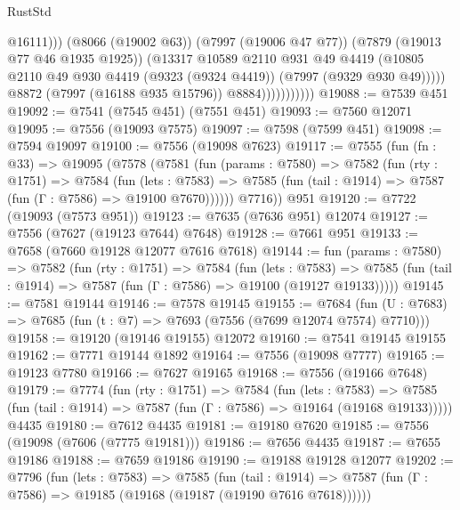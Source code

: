 \begin{lexlean}{RustStd}
\begin{coremodule}
                                  @16111)))
                            (@8066 (@19002 @63))
                            (@7997 (@19006 @47 @77))
                            (@7879 (@19013 @77 @46 @1935 @1925))
                            (@13317
                              @10589
                              @2110
                              @931
                              @49
                              @4419
                              (@10805
                                @2110
                                @49
                                @930
                                @4419
                                (@9323 (@9324 @4419))
                                (@7997 (@9329 @930 @49)))))
                          @8872
                          (@7997 (@16188 @935 @15796))
                          @8884)))))))))))
@19088 := @7539 @451
@19092 := @7541 (@7545 @451) (@7551 @451)
@19093 := @7560 @12071
@19095 := @7556 (@19093 @7575)
@19097 := @7598 (@7599 @451)
@19098 := @7594 @19097
@19100 := @7556 (@19098 @7623)
@19117 := @7555
    (fun (fn : @33) =>
    @19095
      (@7578
        (@7581
          (fun (params : @7580) =>
          @7582
            (fun (rty : @1751) =>
            @7584
              (fun (lets : @7583) =>
              @7585 (fun (tail : @1914) => @7587 (fun (Γ : @7586) => @19100 @7670))))))
        @7716))
    @951
@19120 := @7722 (@19093 (@7573 @951))
@19123 := @7635 (@7636 @951) @12074
@19127 := @7556 (@7627 (@19123 @7644) @7648)
@19128 := @7661 @951
@19133 := @7658 (@7660 @19128 @12077 @7616 @7618)
@19144 := fun (params : @7580) =>
  @7582
    (fun (rty : @1751) =>
    @7584
      (fun (lets : @7583) =>
      @7585 (fun (tail : @1914) => @7587 (fun (Γ : @7586) => @19100 (@19127 @19133)))))
@19145 := @7581 @19144
@19146 := @7578 @19145
@19155 := @7684
    (fun (U : @7683) => @7685 (fun (t : @7) => @7693 (@7556 (@7699 @12074 @7574) @7710)))
@19158 := @19120 (@19146 @19155) @12072
@19160 := @7541 @19145 @19155
@19162 := @7771 @19144 @1892
@19164 := @7556 (@19098 @7777)
@19165 := @19123 @7780
@19166 := @7627 @19165
@19168 := @7556 (@19166 @7648)
@19179 := @7774
    (fun (rty : @1751) =>
    @7584
      (fun (lets : @7583) =>
      @7585 (fun (tail : @1914) => @7587 (fun (Γ : @7586) => @19164 (@19168 @19133)))))
    @4435
@19180 := @7612 @4435
@19181 := @19180 @7620
@19185 := @7556 (@19098 (@7606 (@7775 @19181)))
@19186 := @7656 @4435
@19187 := @7655 @19186
@19188 := @7659 @19186
@19190 := @19188 @19128 @12077
@19202 := @7796
    (fun (lets : @7583) =>
    @7585
      (fun (tail : @1914) =>
      @7587 (fun (Γ : @7586) => @19185 (@19168 (@19187 (@19190 @7616 @7618))))))

\end{coremodule}
\end{lexlean}
